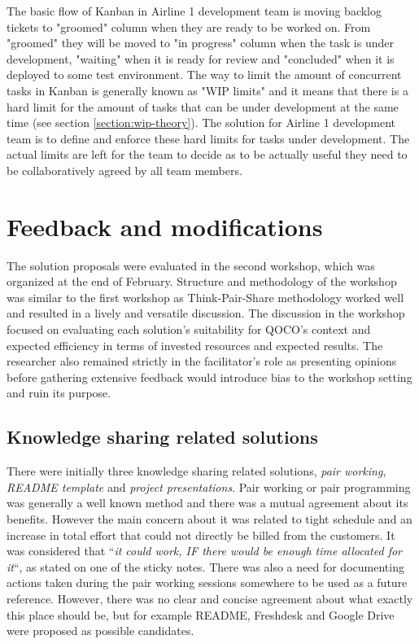 The basic flow of Kanban in Airline 1 development team is moving backlog tickets to "groomed" column when they are ready
to be worked on. From "groomed" they will be moved to "in progress" column when the task is under development, "waiting" when it is ready for review and "concluded" when it is deployed to
some test environment. The way to limit the amount of concurrent tasks in Kanban is generally known as "WIP limits" and it means that there is a hard limit for the amount of tasks that can be
under development at the same time (see section \ref{section:wip-theory}). 
The solution for Airline 1 development team is to define and enforce these hard limits for tasks under development.
The actual limits are left for the team to decide as to be actually useful they need to be collaboratively agreed by all team members.

\section{Feedback and modifications}
\label{section:solution-feedback}

The solution proposals were evaluated in the second workshop, which was organized at the end of February. Structure and methodology of the workshop was similar to the first
workshop as Think-Pair-Share methodology worked well and resulted in a lively and versatile discussion. The discussion in the workshop focused on evaluating each solution's
suitability for QOCO's context and expected efficiency in terms of invested resources and expected results. The researcher also remained strictly in the facilitator's role
as presenting opinions before gathering extensive feedback would introduce bias to the workshop setting and ruin its purpose.

\subsection{Knowledge sharing related solutions}

There were initially three knowledge sharing related solutions, \emph{pair working}, \emph{README template} and \emph{project presentations}.
Pair working or pair programming was generally a well known method and there was a mutual agreement about its benefits. However the main concern about it was related to
tight schedule and an increase in total effort that could not directly be billed from the customers. It was considered that ``\emph{it could work, IF there would be enough time allocated
for it}``, as stated on one of the sticky notes. There was also a need for documenting actions taken during the pair working sessions somewhere to be used as a future reference.
However, there was no clear and concise agreement about what exactly this place should be, but for example README, Freshdesk and Google Drive were proposed
as possible candidates.

